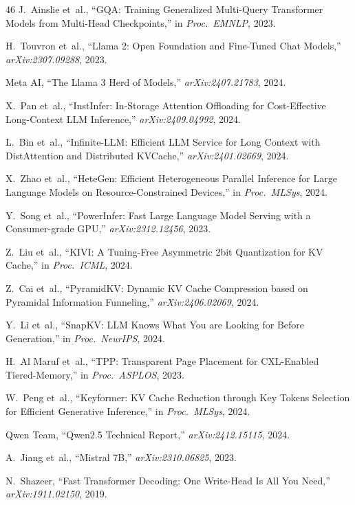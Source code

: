 \documentclass[conference]{IEEEtran}
\begin{document}
\begin{thebibliography}{46}
 J.~Ainslie et~al., ``GQA: Training Generalized Multi-Query Transformer Models from Multi-Head Checkpoints,'' in \textit{Proc.\ EMNLP}, 2023.

 H.~Touvron et~al., ``Llama 2: Open Foundation and Fine-Tuned Chat Models,'' \textit{arXiv:2307.09288}, 2023.

 Meta AI, ``The Llama 3 Herd of Models,'' \textit{arXiv:2407.21783}, 2024.

 X.~Pan et~al., ``InstInfer: In-Storage Attention Offloading for Cost-Effective Long-Context LLM Inference,'' \textit{arXiv:2409.04992}, 2024.

 L.~Bin et~al., ``Infinite-LLM: Efficient LLM Service for Long Context with DistAttention and Distributed KVCache,'' \textit{arXiv:2401.02669}, 2024.

 X.~Zhao et~al., ``HeteGen: Efficient Heterogeneous Parallel Inference for Large Language Models on Resource-Constrained Devices,'' in \textit{Proc.\ MLSys}, 2024.

 Y.~Song et~al., ``PowerInfer: Fast Large Language Model Serving with a Consumer-grade GPU,'' \textit{arXiv:2312.12456}, 2023.

 Z.~Liu et~al., ``KIVI: A Tuning-Free Asymmetric 2bit Quantization for KV Cache,'' in \textit{Proc.\ ICML}, 2024.

 Z.~Cai et~al., ``PyramidKV: Dynamic KV Cache Compression based on Pyramidal Information Funneling,'' \textit{arXiv:2406.02069}, 2024.

 Y.~Li et~al., ``SnapKV: LLM Knows What You are Looking for Before Generation,'' in \textit{Proc.\ NeurIPS}, 2024.

 H.~Al Maruf et~al., ``TPP: Transparent Page Placement for CXL-Enabled Tiered-Memory,'' in \textit{Proc.\ ASPLOS}, 2023.

 W.~Peng et~al., ``Keyformer: KV Cache Reduction through Key Tokens Selection for Efficient Generative Inference,'' in \textit{Proc.\ MLSys}, 2024.

 Qwen Team, ``Qwen2.5 Technical Report,'' \textit{arXiv:2412.15115}, 2024.

 A.~Jiang et~al., ``Mistral 7B,'' \textit{arXiv:2310.06825}, 2023.

 N.~Shazeer, ``Fast Transformer Decoding: One Write-Head Is All You Need,'' \textit{arXiv:1911.02150}, 2019.


\end{thebibliography}
\end{document}
